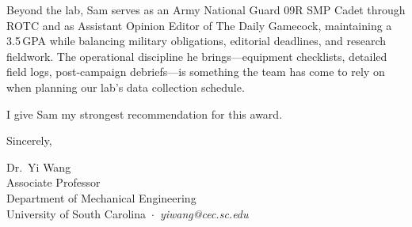 \documentclass[12pt]{article}
\begin{document}
Beyond the lab, Sam serves as an Army National Guard 09R SMP Cadet through ROTC and as Assistant Opinion Editor of The Daily Gamecock, maintaining a 3.5\,GPA while balancing military obligations, editorial deadlines, and research fieldwork. The operational discipline he brings---equipment checklists, detailed field logs, post-campaign debriefs---is something the team has come to rely on when planning our lab's data collection schedule.

I give Sam my strongest recommendation for this award.

\vspace{0.5em}

\noindent
Sincerely,

\vspace{1.0em}

\noindent
Dr.\ Yi Wang\\
Associate Professor\\
Department of Mechanical Engineering\\
University of South Carolina \,$\cdot$\, \textit{yiwang@cec.sc.edu}
\end{document}

